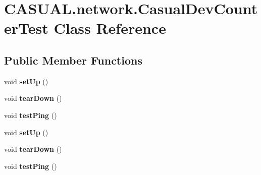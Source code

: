 \hypertarget{class_c_a_s_u_a_l_1_1network_1_1_casual_dev_counter_test}{\section{C\-A\-S\-U\-A\-L.\-network.\-Casual\-Dev\-Counter\-Test Class Reference}
\label{class_c_a_s_u_a_l_1_1network_1_1_casual_dev_counter_test}
}
\subsection*{Public Member Functions}
\begin{DoxyCompactItemize}
\item 
\hypertarget{class_c_a_s_u_a_l_1_1network_1_1_casual_dev_counter_test_a96ae63c9e5d0c4acf0e2a6611340941b}{void {\bfseries set\-Up} ()}\label{class_c_a_s_u_a_l_1_1network_1_1_casual_dev_counter_test_a96ae63c9e5d0c4acf0e2a6611340941b}

\item 
\hypertarget{class_c_a_s_u_a_l_1_1network_1_1_casual_dev_counter_test_ad7f374ee864abb6453b444a079024274}{void {\bfseries tear\-Down} ()}\label{class_c_a_s_u_a_l_1_1network_1_1_casual_dev_counter_test_ad7f374ee864abb6453b444a079024274}

\item 
\hypertarget{class_c_a_s_u_a_l_1_1network_1_1_casual_dev_counter_test_a1ba763b513cd1c770c9b1f372e8ffbc0}{void {\bfseries test\-Ping} ()}\label{class_c_a_s_u_a_l_1_1network_1_1_casual_dev_counter_test_a1ba763b513cd1c770c9b1f372e8ffbc0}

\item 
\hypertarget{class_c_a_s_u_a_l_1_1network_1_1_casual_dev_counter_test_a96ae63c9e5d0c4acf0e2a6611340941b}{void {\bfseries set\-Up} ()}\label{class_c_a_s_u_a_l_1_1network_1_1_casual_dev_counter_test_a96ae63c9e5d0c4acf0e2a6611340941b}

\item 
\hypertarget{class_c_a_s_u_a_l_1_1network_1_1_casual_dev_counter_test_ad7f374ee864abb6453b444a079024274}{void {\bfseries tear\-Down} ()}\label{class_c_a_s_u_a_l_1_1network_1_1_casual_dev_counter_test_ad7f374ee864abb6453b444a079024274}

\item 
\hypertarget{class_c_a_s_u_a_l_1_1network_1_1_casual_dev_counter_test_a1ba763b513cd1c770c9b1f372e8ffbc0}{void {\bfseries test\-Ping} ()}\label{class_c_a_s_u_a_l_1_1network_1_1_casual_dev_counter_test_a1ba763b513cd1c770c9b1f372e8ffbc0}

\end{DoxyCompactItemize}
